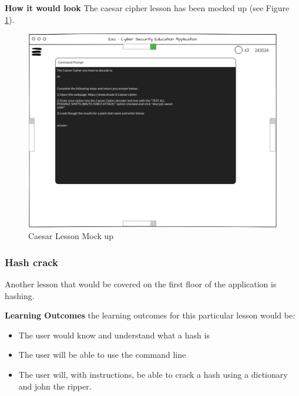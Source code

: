 \documentclass[12pt,a4paper]{article}
\begin{document}
\textbf{How it would look}  
The caesar cipher lesson has been mocked up (see Figure \ref{caesarmock}).
\begin{figure}[h]
    \centering
    \includegraphics[width=1.0\textwidth]{Figs/caesermock.PNG} 
    \caption{Caesar Lesson Mock up} 
    \label{caesarmock}
\end{figure}   


 


 
\subsubsection{Hash crack}   

Another lesson that would be covered on the first floor of the application is hashing. 

\textbf{Learning Outcomes} 
\newline the learning outcomes for this particular lesson would be:  

\begin{itemize}\itemsep0pt
	\item The user would know and understand what a hash is 
	\item The user will be able to use the command line 
	\item The user will, with instructions, be able to crack a hash using a dictionary and john the ripper. 
\end{itemize} 
\end{document}
